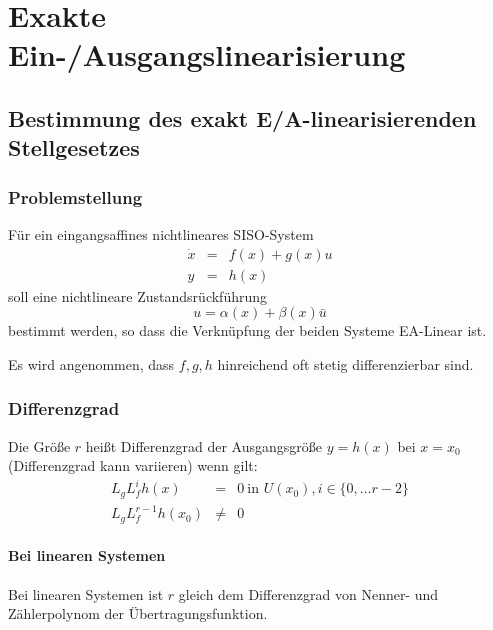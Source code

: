 \chapter{Exakte Ein-/Ausgangslinearisierung}
\section{Bestimmung des exakt E/A-linearisierenden Stellgesetzes}
\subsection{Problemstellung}
Für ein eingangsaffines nichtlineares SISO-System
\begin{eqnarray}
    \dot{x} &=& f(x) + g(x) u \\
    y &=& h(x)
\end{eqnarray}
soll eine nichtlineare Zustandsrückführung
\begin{equation}
    u = \alpha(x) + \beta(x) \bar{u}
\end{equation} 
bestimmt werden, so dass die Verknüpfung der beiden Systeme EA-Linear ist.

Es wird angenommen, dass $f, g, h$ hinreichend oft stetig differenzierbar sind.

\subsection{Differenzgrad}
Die Größe $r$ heißt Differenzgrad der Ausgangsgröße $y=h(x)$ bei $x=x_0$ (Differenzgrad
kann variieren) wenn gilt:
\begin{eqnarray}
    L_g L_f^i h(x) &=& 0\ \text{in } U(x_0), i \in \{0, \ldots r-2\} \\
    L_g L_f^{r-1} h(x_0) &\neq& 0
\end{eqnarray}

\subsubsection{Bei linearen Systemen}
Bei linearen Systemen ist $r$ gleich dem Differenzgrad von Nenner- und Zählerpolynom
der Übertragungsfunktion.

